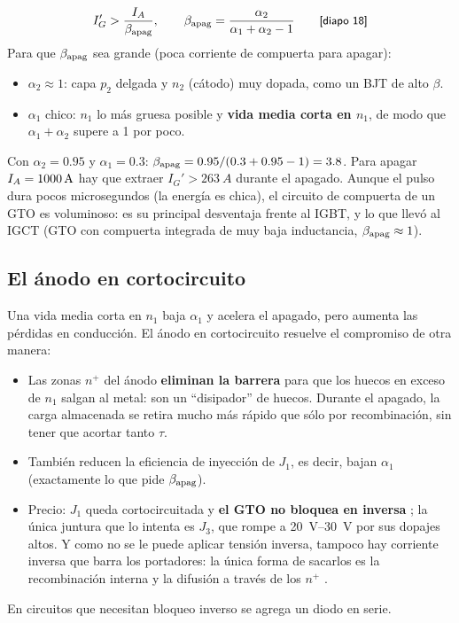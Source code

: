 \begin{clave}
\[
  I_G'>\frac{I_{A}}{\beta_{\mathrm{apag}}},\qquad
  \beta_{\mathrm{apag}}=\frac{\alpha_2}{\alpha_1+\alpha_2-1}\qquad\text{{\small\textsf{[diapo~18]}}}
\]
Para que $\beta_{\mathrm{apag}}$ sea grande (poca corriente de compuerta para apagar):
\begin{itemize}
  \item $\alpha_2\approx1$: capa $p_2$ delgada y $n_2$ (cátodo) muy dopada, como un BJT de alto $\beta$.
  \item $\alpha_1$ chico: $n_1$ lo más gruesa posible y \textbf{vida media corta en $n_1$}, de modo que
  $\alpha_1+\alpha_2$ supere a 1 por poco.
\end{itemize}
\end{clave}

\begin{ejemplo}
Con $\alpha_2=0.95$ y $\alpha_1=0.3$: $\beta_{\mathrm{apag}}=0.95/(0.3+0.95-1)=3.8$. Para apagar $I_{A}=\SI{1000}{A}$
hay que extraer $I_G'>\SI{263}{A}$ durante el apagado. Aunque el pulso dura pocos microsegundos (la
energía es chica), el circuito de compuerta de un GTO es voluminoso: es su principal desventaja frente
al IGBT, y lo que llevó al IGCT (GTO con compuerta integrada de muy baja inductancia, $\beta_{\mathrm{apag}}\approx1$).
\end{ejemplo}

\subsection{El ánodo en cortocircuito}

 Una vida media corta en $n_1$ baja $\alpha_1$ y acelera el apagado, pero aumenta las
pérdidas en conducción. El ánodo en cortocircuito resuelve el compromiso de otra manera:
\begin{itemize}
  \item Las zonas $n^+$ del ánodo \textbf{eliminan la barrera} para que los huecos en exceso de $n_1$
  salgan al metal: son un ``disipador'' de huecos. Durante el apagado, la carga almacenada se retira
  mucho más rápido que sólo por recombinación, sin tener que acortar tanto $\tau$.
  \item También reducen la eficiencia de inyección de $J_1$, es decir, bajan $\alpha_1$
  (exactamente lo que pide $\beta_{\mathrm{apag}}$).
  \item Precio: $J_1$ queda cortocircuitada y \textbf{el GTO no bloquea en inversa} ; la
  única juntura que lo intenta es $J_3$, que rompe a \SIrange{20}{30}{V} por sus dopajes altos. Y como
  no se le puede aplicar tensión inversa, tampoco hay corriente inversa que barra los portadores: la
  única forma de sacarlos es la recombinación interna y la difusión a través de los $n^+$
  .
\end{itemize}
En circuitos que necesitan bloqueo inverso se agrega un diodo en serie.

